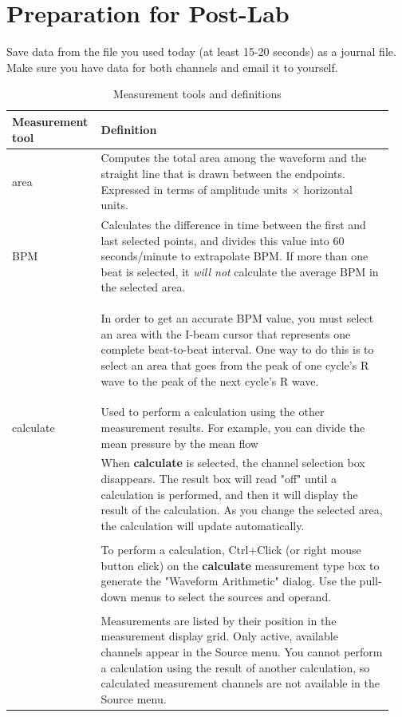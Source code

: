 \documentclass{article}
\begin{document}
\section*{Preparation for Post-Lab}
Save data from the file you used today (at least 15-20 seconds) as a journal file. Make sure you have data for both channels and email it to yourself.

\pagebreak
\begin{table}[h!]
	\centering
	\caption{Measurement tools and definitions}
	\label{table_defs}
\begin{tabular}[h!]{p{0.2\linewidth}p{0.75\linewidth}}
\toprule
Measurement tool & Definition\\
\midrule
area & Computes the total area among the waveform and the straight line that is drawn between the endpoints. Expressed in terms of amplitude units $\times$ horizontal units.\\
\midrule
BPM & Calculates the difference in time between the first and last selected points, and divides this value into 60 seconds/minute to extrapolate BPM. If more than one beat is selected, it \textit{will not} calculate the average BPM in the selected area.\\
	& \begin{info}
 	In order to get an accurate BPM value, you must select an area with the I-beam cursor that represents one complete beat-to-beat interval. One way to do this is to select an area that goes from the peak of one cycle's R wave to the peak of the next cycle's R wave.
 	\end{info}\\
\midrule
calculate & Used to perform a calculation using the other measurement results. For example, you can divide the mean pressure by the mean flow\\
	& When \textbf{calculate} is selected, the channel selection box disappears. The result box will read "off" until a calculation is performed, and then it will display the result of the calculation. As you change the selected area, the calculation will update automatically.\\
	& \\
	& To perform a calculation, Ctrl+Click (or right mouse button click) on the \textbf{calculate} measurement type box to generate the "Waveform Arithmetic" dialog. Use the pull-down menus to select the sources and operand.\\
	& \\
	& Measurements are listed by their position in the measurement display grid. Only active, available channels appear in the Source menu. You cannot perform a calculation using the result of another calculation, so calculated measurement channels are not available in the Source menu.\\

\end{tabular}
\end{table}
\end{document}

